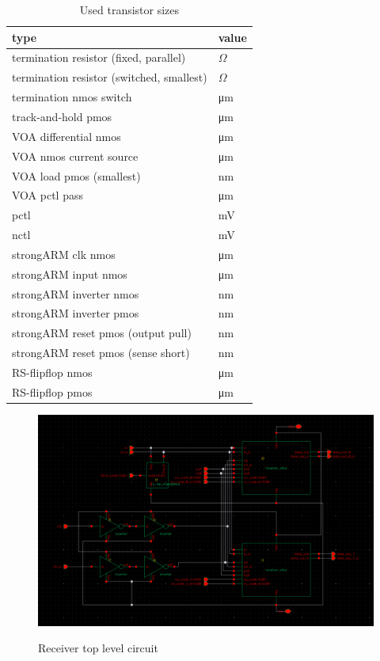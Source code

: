 \begin{table}[H]
  \centering
  \begin{tabular}{l|l}
    type & value\\
    \hline
    termination resistor (fixed, parallel) & \unit[131]{$\Omega$}\\
    termination resistor (switched, smallest) & \unit[220]{$\Omega$}\\
    termination nmos switch & \unit[20]{\um}\\
    \hline
    track-and-hold pmos & \unit[20]{\um}\\
    \hline
    VOA differential nmos & \unit[2]{\um}\\
    VOA nmos current source & \unit[16]{\um}\\
    VOA load pmos (smallest) & \unit[400]{nm}\\
    VOA pctl pass & \unit[10]{\um}\\
    pctl & \unit[757]{mV}\\
    nctl & \unit[320]{mV}\\
    \hline
    strongARM clk nmos & \unit[2]{\um}\\
    strongARM input nmos & \unit[2]{\um}\\
    strongARM inverter nmos & \unit[300]{nm}\\
    strongARM inverter pmos & \unit[600]{nm}\\
    strongARM reset pmos (output pull) & \unit[750]{nm}\\
    strongARM reset pmos (sense short) & \unit[200]{nm}\\
    \hline
    RS-flipflop nmos & \unit[2]{\um}\\
    RS-flipflop pmos & \unit[2]{\um}\\
  \end{tabular}
  \caption{Used transistor sizes}
  \label{tab:scaling}
\end{table}

\begin{figure}[H]
  \centering
  {\includegraphics[scale=0.4]{schematics/receiver.png}}
  \caption{Receiver top level circuit}
  \label{fig:top_level}
\end{figure}

